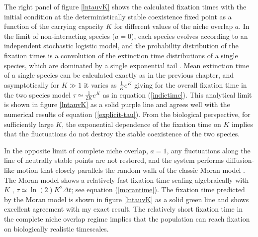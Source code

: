 The right panel of figure \ref{lntauvK} shows the calculated fixation times with the initial condition at the deterministically stable coexistence fixed point as a function of the carrying capacity $K$ for different values of the niche overlap $a$. 
In the limit of non-interacting species ($a=0$), each species evolves according to an independent stochastic logistic model, and the  probability distribution of the fixation times is a convolution of the extinction time distributions of a single species, which are dominated by a single exponential tail \cite{Norden1982,Hanggi1990,Ovaskainen2010}. 
Mean extinction time of a single species can be calculated exactly as in the previous chapter, and asymptotically for $K\gg 1$ it varies as $\frac{1}{K} e^K$ \cite{Lande1993} giving for the overall fixation time in the two species model  $\tau \simeq \frac{1}{2K} e^K$ as in equation (\ref{indietime}).
This analytical limit is shown in figure \ref{lntauvK} as a solid purple line and agrees well with the numerical results of equation (\ref{explicit-tau}). 
From the biological perspective, for sufficiently large $K$, the exponential dependence of the fixation time on $K$ implies that the fluctuations do not destroy the stable coexistence of the two species. %

In the opposite limit of complete niche overlap, $a=1$, any fluctuations along the line of neutrally stable points are not restored, and the system performs diffusion-like motion that closely parallels the random walk of the classic Moran model \cite{Antal2006,Chotibut2015,Dobrinevski2012,Fisher2014,Constable2015,Lin2012,Kessler2007,Young2018}. 
The Moran model shows a relatively fast fixation time scaling algebraically with $K$ \cite{Moran1962,Lin2012}, $\tau \simeq \ln(2) K^2 \Delta t$; see equation (\ref{morantime}). 
The fixation time predicted by the Moran model is shown in figure \ref{lntauvK} as a solid green line and shows excellent agreement with my exact result. 
The relatively short fixation time in the complete niche overlap regime implies that the population can reach fixation on biologically realistic timescales. 

